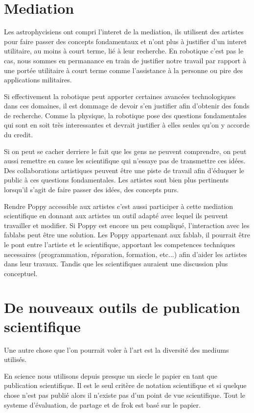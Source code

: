 \section{Mediation} %
Les astrophycisiens ont compri l'interet de la mediation, ils utilisent des artistes pour faire passer des concepts fondamentaux et n'ont plus à justifier d'un interet utilitaire, au moins à court terme, lié à leur recherche.
En robotique c'est pas le cas, nous sommes en permanance en train de justifier notre travail par rapport à une portée utilitaire à court terme comme l'assistance à la personne ou pire des applications militaires.

Si effectivement la robotique peut apporter certaines avancées technologiques dans ces domaines, il est dommage de devoir s'en justifier afin d'obtenir des fonds de recherche. Comme la physique, la robotique pose des questions fondamentales qui sont en soit très interessantes et devrait justifier à elles seules qu'on y accorde du credit.

Si on peut se cacher derriere le fait que les gens ne peuvent comprendre, on peut aussi remettre en cause les scientifique qui n'essaye pas de transmettre ces idées. Des collaborations artistiques peuvent être une piste de travail afin d'éduquer le public à ces questions fondamentales. Les artistes sont bien plus pertinents lorsqu'il s'agit de faire passer des idées, des concepts purs.

Rendre Poppy accessible aux artistes c'est aussi participer à cette mediation scientifique en donnant aux artistes un outil adapté avec lequel ils peuvent travailler et modifier. Si Poppy est encore un peu compliqué, l'interaction avec les fablabs peut être une solution. Les Poppy appartenant aux fablab, il pourrait être le pont entre l'artiste et le scientifique, apportant les competences techniques necessaires (programmation, réparation, formation, etc...) afin d'aider les artistes dans leur travaux. Tandis que les scientifiques auraient une discussion plus conceptuel.

\section{De nouveaux outils de publication scientifique} %

Une autre chose que l'on pourrait voler à l'art est la diversité des mediums utilisés.

En science nous utilisons depuis presque un siecle le papier en tant que publication scientifique. Il est le seul critère de notation scientifique et si quelque chose n'est pas publié alors il n'existe pas d'un point de vue scientifique. Tout le systeme d'évaluation, de partage et de frok est basé sur le papier.

